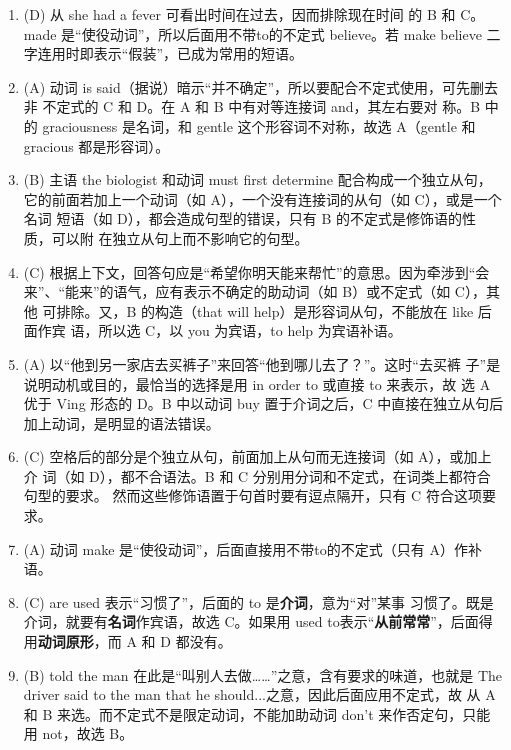 \begin{enumerate}
\item (D) 从 she had a fever 可看出时间在过去，因而排除现在时间
  的 B 和 C。made 是“使役动词”，所以后面用不带to的不定式 believe。若 make
  believe 二字连用时即表示“假装”，已成为常用的短语。

\item (A) 动词 is said（据说）暗示“并不确定”，所以要配合不定式使用，可先删去非
  不定式的 C 和 D。在 A 和 B 中有对等连接词 and，其左右要对
  称。B 中的 graciousness 是名词，和 gentle 这个形容词不对称，故选 A（gentle
  和 gracious 都是形容词）。

\item (B) 主语 the biologist 和动词 must first determine 配合构成一个独立从句，
  它的前面若加上一个动词（如 A），一个没有连接词的从句（如 C），或是一个名词
  短语（如 D），都会造成句型的错误，只有 B 的不定式是修饰语的性质，可以附
  在独立从句上而不影响它的句型。

\item (C) 根据上下文，回答句应是“希望你明天能来帮忙”的意思。因为牵涉到“会
  来”、“能来”的语气，应有表示不确定的助动词（如 B）或不定式（如 C），其他
  可排除。又，B 的构造（that will help）是形容词从句，不能放在 like 后面作宾
  语，所以选 C，以 you 为宾语，to help 为宾语补语。

\item (A) 以“他到另一家店去买裤子”来回答“他到哪儿去了？”。这时“去买裤
  子”是说明动机或目的，最恰当的选择是用 in order to 或直接 to 来表示，故
  选 A 优于 Ving 形态的 D。B 中以动词 buy 置于介词之后，C 中直接在独立从句后
  加上动词，是明显的语法错误。


\item (C) 空格后的部分是个独立从句，前面加上从句而无连接词（如 A），或加上介
  词（如 D），都不合语法。B 和 C 分别用分词和不定式，在词类上都符合句型的要求。
  然而这些修饰语置于句首时要有逗点隔开，只有 C 符合这项要求。

\item (A) 动词 make 是“使役动词”，后面直接用不带to的不定式（只有 A）作补语。

\item (C) are used 表示“习惯了”，后面的 to 是\textbf{介词}，意为“对”某事
  习惯了。既是介词，就要有\textbf{名词}作宾语，故选 C。如果用 used
  to表示“\textbf{从前常常}”，后面得用\textbf{动词原形}，而 A 和 D 都没有。

\item (B) told the man 在此是“叫别人去做……”之意，含有要求的味道，也就是 The
  driver said to the man that he should...之意，因此后面应用不定式，故
  从 A 和 B 来选。而不定式不是限定动词，不能加助动词 don’t 来作否定句，只能
  用 not，故选 B。


\end{enumerate}
